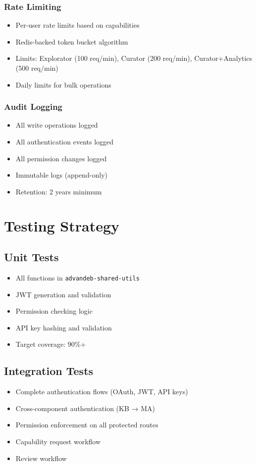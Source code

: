 \documentclass[12pt,a4paper]{article}
\begin{document}
\subsubsection{Rate Limiting}
\begin{itemize}
    \item Per-user rate limits based on capabilities
    \item Redis-backed token bucket algorithm
    \item Limits: Explorator (100 req/min), Curator (200 req/min), Curator+Analytics (500 req/min)
    \item Daily limits for bulk operations
\end{itemize}

\subsubsection{Audit Logging}
\begin{itemize}
    \item All write operations logged
    \item All authentication events logged
    \item All permission changes logged
    \item Immutable logs (append-only)
    \item Retention: 2 years minimum
\end{itemize}

\section{Testing Strategy}

\subsection{Unit Tests}
\begin{itemize}
    \item All functions in \texttt{advandeb-shared-utils}
    \item JWT generation and validation
    \item Permission checking logic
    \item API key hashing and validation
    \item Target coverage: 90\%+
\end{itemize}

\subsection{Integration Tests}
\begin{itemize}
    \item Complete authentication flows (OAuth, JWT, API keys)
    \item Cross-component authentication (KB → MA)
    \item Permission enforcement on all protected routes
    \item Capability request workflow
    \item Review workflow
\end{itemize}
\end{document}
